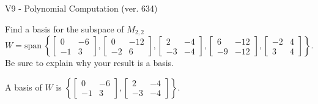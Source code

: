 \begin{exercise}
  \begin{exerciseTitle}V9 - Polynomial Computation (ver. 634)\end{exerciseTitle}
  \begin{exerciseStatement}
    Find a basis for the subspace of \(M_{2,2}\) 
\[W=\mathrm{span}\ \left\{\left[\begin{array}{cc}
0 & -6 \\
-1 & 3
\end{array}\right] , \left[\begin{array}{cc}
0 & -12 \\
-2 & 6
\end{array}\right] , \left[\begin{array}{cc}
2 & -4 \\
-3 & -4
\end{array}\right] , \left[\begin{array}{cc}
6 & -12 \\
-9 & -12
\end{array}\right] , \left[\begin{array}{cc}
-2 & 4 \\
3 & 4
\end{array}\right]\right\}.\]
 Be sure to explain why your result is a basis.


  \end{exerciseStatement}
  \begin{exerciseAnswer}
   A basis of \(W\) is  \(\left\{\left[\begin{array}{cc}
0 & -6 \\
-1 & 3
\end{array}\right] , \left[\begin{array}{cc}
2 & -4 \\
-3 & -4
\end{array}\right]\right\}\).
  


  \end{exerciseAnswer}
\end{exercise}